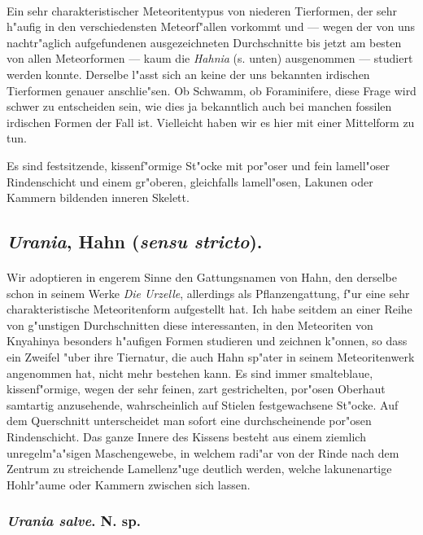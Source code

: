 \documentclass[a4paper, 11pt, oneside]{article}
\begin{document}
\paragraph{}
Ein sehr charakteristischer Meteoritentypus von niederen Tierformen, der sehr h"aufig in den verschiedensten Meteorf"allen vorkommt und --- wegen der von uns nachtr"aglich aufgefundenen ausgezeichneten Durchschnitte bis jetzt am besten von allen Meteorformen --- kaum die \emph{Hahnia} (s. unten) ausgenommen --- studiert werden konnte. Derselbe l"asst sich an keine der uns bekannten irdischen Tierformen genauer anschlie"sen. Ob Schwamm, ob Foraminifere, diese Frage wird schwer zu entscheiden sein, wie dies ja bekanntlich auch bei manchen fossilen irdischen Formen der Fall ist. Vielleicht haben wir es hier mit einer Mittelform zu tun.

Es sind festsitzende, kissenf"ormige St"ocke mit por"oser und fein lamell"oser Rindenschicht und einem gr"oberen, gleichfalls lamell"osen, Lakunen oder Kammern bildenden inneren Skelett.
\subsection{\emph{Urania}, Hahn (\emph{sensu stricto}).}
\paragraph{}
Wir adoptieren in engerem Sinne den Gattungsnamen von Hahn, den derselbe schon in seinem Werke \emph{Die Urzelle}, allerdings als Pflanzengattung, f"ur eine sehr charakteristische Meteoritenform aufgestellt hat. Ich habe seitdem an einer Reihe von g"unstigen Durchschnitten diese interessanten, in den Meteoriten von Knyahinya besonders h"aufigen Formen studieren und zeichnen k"onnen, so dass ein Zweifel "uber ihre Tiernatur, die auch Hahn sp"ater in seinem Meteoritenwerk angenommen hat, nicht mehr bestehen kann. Es sind immer smalteblaue, kissenf"ormige, wegen der sehr feinen, zart gestrichelten, por"osen Oberhaut samtartig anzusehende, wahrscheinlich auf Stielen festgewachsene St"ocke. Auf dem Querschnitt unterscheidet man sofort eine durchscheinende por"osen Rindenschicht. Das ganze Innere des Kissens besteht aus einem ziemlich unregelm"a"sigen Maschengewebe, in welchem radi"ar von der Rinde nach dem Zentrum zu streichende Lamellenz"uge deutlich werden, welche lakunenartige Hohlr"aume oder Kammern zwischen sich lassen.
\subsubsection{\emph{Urania salve}. N. sp.}
\end{document}
